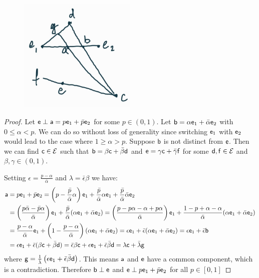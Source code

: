 \begin{figure}[h]
	\includegraphics[width=0.5\textwidth]{tempimages/DistinctAndMixture.jpg}
\end{figure}

\begin{proof}
	Let $\ens \distinct \ens[a] = p \ens_1 + \bar{p} \ens_2$ for some $p \in (0, 1)$. Let $\ens[b] = \alpha \ens_1 + \bar{\alpha} \ens_2$ with $0 \leq \alpha < p$. We can do so without loss of generality since switching $\ens_1$ with $\ens_2$ would lead to the case where $1 \geq \alpha > p$. Suppose $\ens[b]$ is not distinct from $\ens$. Then we can find $\ens[c] \in \Ens$ such that $\ens[b] = \beta \ens[c] + \bar{\beta} \ens[d]$ and $\ens = \gamma \ens[c] + \bar{\gamma} \ens[f]$ for some $\ens[d], \ens[f] \in \Ens$ and $\beta, \gamma \in (0, 1)$.
	
	Setting $\epsilon = \frac{p - \alpha}{\bar{\alpha}}$ and $\lambda = \bar{\epsilon} \beta$ we have:
	\begin{align*}
		\ens[a] &= p \ens_1 + \bar{p} \ens_2 = \left(p - \frac{\bar{p}}{\bar{\alpha}} \alpha \right) \ens_1 + \frac{\bar{p}}{\bar{\alpha}} \alpha \ens_1 + \frac{\bar{p}}{\bar{\alpha}} \bar{\alpha}\ens_2 \\
		&= \left(\frac{p\bar{\alpha} - \bar{p}\alpha}{\bar{\alpha}} \right) \ens_1 + \frac{\bar{p}}{\bar{\alpha}} (\alpha \ens_1 + \bar{\alpha} \ens_2) = \left(\frac{p - p\alpha - \alpha + p \alpha}{\bar{\alpha}} \right) \ens_1 + \frac{1 - p + \alpha - \alpha}{\bar{\alpha}} (\alpha \ens_1 + \bar{\alpha} \ens_2) \\
		&= \frac{p - \alpha}{\bar{\alpha}}  \ens_1 + \left( 1 - \frac{p - \alpha}{\bar{\alpha}}\right) (\alpha \ens_1 + \bar{\alpha} \ens_2) = \epsilon \ens_1 + \bar{\epsilon} (\alpha \ens_1 + \bar{\alpha} \ens_2) = \epsilon \ens_1 + \bar{\epsilon} \ens[b] \\
		&= \epsilon \ens_1 + \bar{\epsilon} ( \beta \ens[c] + \bar{\beta} \ens[d] ) = \bar{\epsilon} \beta \ens[c] + \epsilon \ens_1 + \bar{\epsilon} \bar{\beta} \ens[d] = \lambda \ens[c] + \bar{\lambda} \ens[g]
	\end{align*}
	where $\ens[g] = \frac{1}{\bar{\lambda}}\left( \epsilon \ens_1 + \bar{\epsilon} \bar{\beta} \ens[d] \right)$. This means $\ens[a]$ and $\ens$ have a common component, which is a contradiction. Therefore $\ens[b] \distinct \ens$ and $\ens \distinct p \ens_1 + \bar{p} \ens_2$ for all $p \in [0, 1]$
	

\end{proof}
